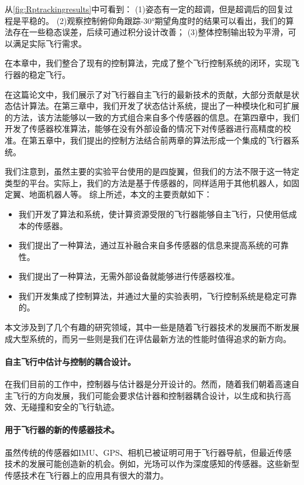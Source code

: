 \documentclass[
  type=master
]{gdutthesis}
\begin{document}
从\autoref{fig:Rptrackingresults}中可看到：
(1)姿态有一定的超调，但是超调后的回复过程是平稳的。
(2)观察控制俯仰角跟踪-30°期望角度时的结果可以看出，我们的算法存在一些稳态误差，后续可通过积分设计改善；
(3)整体控制输出较为平滑，可以满足实际飞行需求。

在本章中，我们整合了现有的控制算法，完成了整个飞行控制系统的闭环，实现飞行器的稳定飞行。

\gdutbackmatter
{}
在这篇论文中，我们展示了对飞行器自主飞行的最新技术的贡献，大部分贡献是状态估计算法。在第三章中，我们开发了状态估计系统，提出了一种模块化和可扩展的方法，该方法能够以一致的方式组合来自多个传感器的信息。在第四章中，我们开发了传感器校准算法，能够在没有外部设备的情况下对传感器进行高精度的校准。在第五章中，我们提出的控制方法结合前两章的算法形成一个集成的飞行器系统。

我们注意到，虽然主要的实验平台使用的是四旋翼，但我们的方法不限于这一特定类型的平台。实际上，我们的方法是基于传感器的，同样适用于其他机器人，如固定翼、地面机器人等。
综上所述，本文的主要贡献如下：
\begin{itemize}
	\item 我们开发了算法和系统，使计算资源受限的飞行器能够自主飞行，只使用低成本的传感器。
	\item 我们提出了一种算法，通过互补融合来自多传感器的信息来提高系统的可靠性。
	\item 我们提出了一种算法，无需外部设备就能够进行传感器校准。
	\item 我们开发集成了控制算法，并通过大量的实验表明，飞行控制系统是稳定可靠的。
\end{itemize}

本文涉及到了几个有趣的研究领域，其中一些是随着飞行器技术的发展而不断发展成大型系统的，而另一些则是我们在评估最新方法的性能时值得追求的新方向。
\paragraph{自主飞行中估计与控制的耦合设计。}
在我们目前的工作中，控制器与估计器是分开设计的。然而，随着我们朝着高速自主飞行的方向发展，我们可能会要求估计器和控制器耦合设计，以生成和执行高效、无碰撞和安全的飞行轨迹。
\paragraph{用于飞行器的新的传感器技术。}
虽然传统的传感器如IMU、GPS、相机已被证明可用于飞行器导航，但最近传感技术的发展可能创造新的机会。例如，光场可以作为深度感知的传感器。这些新型传感技术在飞行器上的应用具有很大的潜力。
\end{document}
